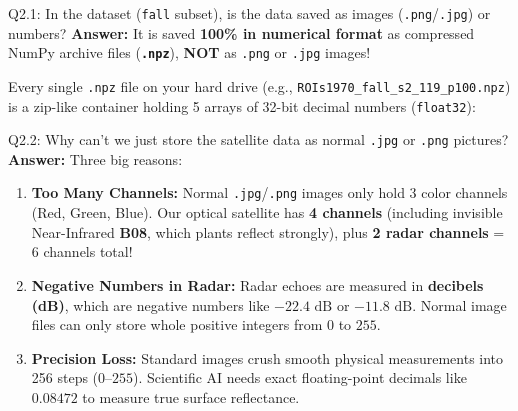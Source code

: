 \documentclass[11pt,a4paper]{article}
\begin{document}
\begin{qbox}{Q2.1: In the dataset (\texttt{fall} subset), is the data saved as images (\texttt{.png}/\texttt{.jpg}) or numbers?}
\textbf{Answer:}
It is saved \textbf{100\% in numerical format} as compressed NumPy archive files (\textbf{\texttt{.npz}}), \textbf{NOT} as \texttt{.png} or \texttt{.jpg} images!

Every single \texttt{.npz} file on your hard drive (e.g., \texttt{ROIs1970\_fall\_s2\_119\_p100.npz}) is a zip-like container holding 5 arrays of 32-bit decimal numbers (\texttt{float32}):
\begin{center}
\end{center}
\end{qbox}

\begin{qbox}{Q2.2: Why can't we just store the satellite data as normal \texttt{.jpg} or \texttt{.png} pictures?}
\textbf{Answer:}
Three big reasons:
\begin{enumerate}[leftmargin=18pt]
    \item \textbf{Too Many Channels:} Normal \texttt{.jpg}/\texttt{.png} images only hold 3 color channels (Red, Green, Blue). Our optical satellite has \textbf{4 channels} (including invisible Near-Infrared \textbf{B08}, which plants reflect strongly), plus \textbf{2 radar channels} = 6 channels total!
    \item \textbf{Negative Numbers in Radar:} Radar echoes are measured in \textbf{decibels (dB)}, which are negative numbers like $-22.4\text{ dB}$ or $-11.8\text{ dB}$. Normal image files can only store whole positive integers from $0$ to $255$.
    \item \textbf{Precision Loss:} Standard images crush smooth physical measurements into 256 steps ($0\text{--}255$). Scientific AI needs exact floating-point decimals like $0.08472$ to measure true surface reflectance.
\end{enumerate}
\end{qbox}
\end{document}
